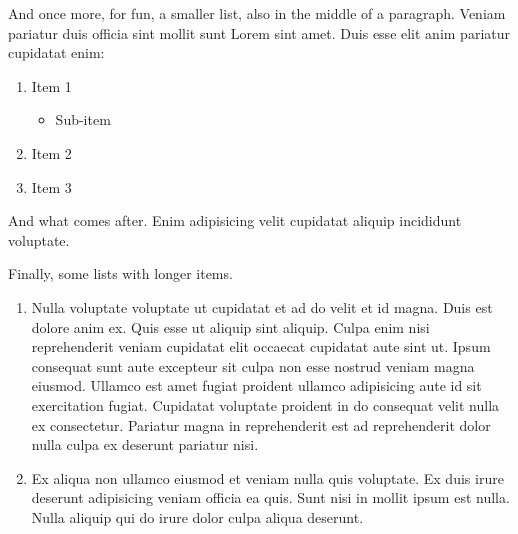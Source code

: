 \documentclass[
    12pt,
    letterpaper,
    oneside,
    noraggedright
]{turabian-researchpaper}
\makeatletter
\providecommand{\tightlist}{%
    \ifthenelse{\equal{\the\@listdepth}{1}}
    {}
    {\vspace{-\baselineskip}}
}
\makeatother
\begin{document}
And once more, for fun, a smaller list, also in the middle of a
paragraph. Veniam pariatur duis officia sint mollit sunt Lorem sint
amet. Duis esse elit anim pariatur cupidatat enim:

\begin{enumerate}
\def\labelenumi{\arabic{enumi}.}
\tightlist
\item
  Item 1

  \begin{itemize}
  \tightlist
  \item
    Sub-item
  \end{itemize}
\item
  Item 2
\item
  Item 3
\end{enumerate}

\noindent{}And what comes after. Enim adipisicing velit cupidatat
aliquip incididunt voluptate.

Finally, some lists with longer items.

\begin{enumerate}
\def\labelenumi{\arabic{enumi}.}
\tightlist
\item
  Nulla voluptate voluptate ut cupidatat et ad do velit et id magna.
  Duis est dolore anim ex. Quis esse ut aliquip sint aliquip. Culpa enim
  nisi reprehenderit veniam cupidatat elit occaecat cupidatat aute sint
  ut. Ipsum consequat sunt aute excepteur sit culpa non esse nostrud
  veniam magna eiusmod. Ullamco est amet fugiat proident ullamco
  adipisicing aute id sit exercitation fugiat. Cupidatat voluptate
  proident in do consequat velit nulla ex consectetur. Pariatur magna in
  reprehenderit est ad reprehenderit dolor nulla culpa ex deserunt
  pariatur nisi.
\item
  Ex aliqua non ullamco eiusmod et veniam nulla quis voluptate. Ex duis
  irure deserunt adipisicing veniam officia ea quis. Sunt nisi in mollit
  ipsum est nulla. Nulla aliquip qui do irure dolor culpa aliqua
  deserunt.
\end{enumerate}
\end{document}
